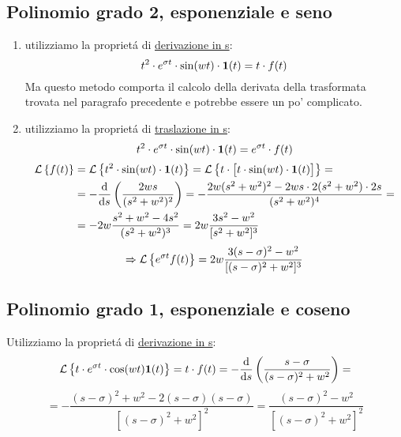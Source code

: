 \documentclass[../main.tex]{subfiles}
\begin{document}
	\subsection{Polinomio grado 2, esponenziale e seno}
		\begin{enumerate}
			\item
				utilizziamo la propriet\'{a} di \hyperref[sec:deriv_s]{derivazione in s}:
				\[
					t^2 \cdot e^{\sigma t} \cdot \sin(wt) \cdot \textbf{1}(t) = t \cdot f(t)
				\]
				Ma questo metodo comporta il calcolo della derivata della trasformata trovata nel paragrafo precedente e potrebbe essere un po' complicato.
			\item
				utilizziamo la propriet\'{a} di \hyperref[sec:trasl_s]{traslazione in s}:
				\[
					t^2 \cdot e^{\sigma t} \cdot \sin(wt) \cdot \textbf{1}(t) = e^{\sigma t} \cdot f(t)
				\]
			\begin{align*}
				\mathcal{L} \left\lbrace f(t) \right\rbrace &= \mathcal{L} \left\lbrace t^2 \cdot \sin(wt) \cdot \textbf{1}(t) \right\rbrace = \mathcal{L} \left\lbrace t \cdot \big[ t \cdot \sin(wt) \cdot \textbf{1}(t) \big] \right\rbrace =
				\\
				&= -\frac{\mathrm{d} }{\mathrm{d} s} \left( \frac{2ws}{(s^2+w^2)^2} \right) = -\frac{2w(s^2+w^2)^2-2ws \cdot 2(s^2+w^2) \cdot 2s}{(s^2+w^2)^4} =
				\\ 
				&= -2w \frac{s^2+w^2-4s^2}{(s^2+w^2)^3} = 2w \frac{3s^2-w^2}{[s^2+w^2]^3}
			\end{align*}
			\[
				\Rightarrow \mathcal{L} \left\lbrace e^{\sigma t} f(t) \right\rbrace = 2w \frac{3(s-\sigma)^2 - w^2}{[(s-\sigma)^2+w^2]^3}
			\]
		\end{enumerate}

	\subsection{Polinomio grado 1, esponenziale e coseno}
		Utilizziamo la propriet\'{a} di \hyperref[sec:deriv_s]{derivazione in s}:
		\[
		 	\mathcal{L} \left\lbrace t\cdot e^{\sigma t} \cdot \cos(wt) \textbf{1}(t) \right\rbrace = t \cdot f(t) = -\frac{\mathrm{d} }{\mathrm{d} s} \left( \frac{s-\sigma}{(s-\sigma)^2+w^2} \right) =
		 \]
		 \[	
		 	=-\frac{(s-\sigma)^2+w^2-2(s-\sigma)(s-\sigma)}{[(s-\sigma)^2+w^2]^2} = \frac{(s-\sigma)^2-w^2}{[(s-\sigma)^2+w^2]^2}
		 \]
		 
\end{document}
